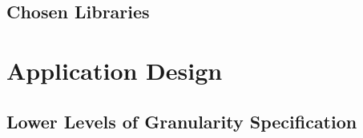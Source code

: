 \documentclass[12pt]{article}
\begin{document}
		
		\subsection{Chosen Libraries}
			\vspace{0.2in}

			
	\section{Application Design}
			\vspace{0.2in}
					
		\subsection{Lower Levels of Granularity Specification}
\end{document}
